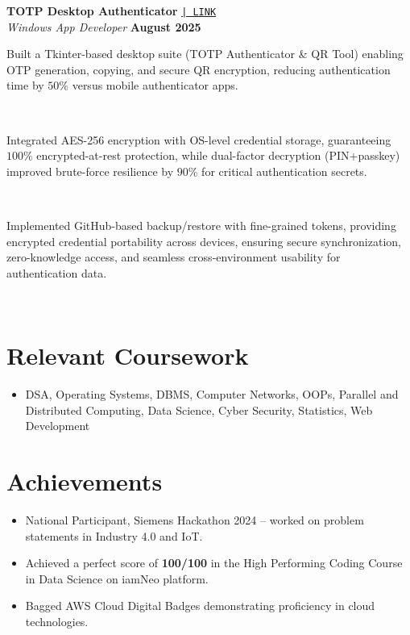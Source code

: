 \documentclass[a4paper,10pt]{article}
\begin{document}
\noindent
\textbf{TOTP Desktop Authenticator}
\href{https://github.com/ppriyanshu26/AuthPublic}{\texttt{| LINK}} \\
\textit{Windows App Developer} \hfill \textbf{August 2025} \\[-8pt]

\noindent\makebox[1.5em][l]{--}%
\parbox[t]{\dimexpr\linewidth-1.5em\relax}{%
Built a Tkinter-based desktop suite (TOTP Authenticator \& QR Tool) enabling OTP generation, copying, and secure QR encryption, reducing authentication time by $50\%$ versus mobile authenticator apps.} \\[-2pt]

\noindent\makebox[1.5em][l]{--}%
\parbox[t]{\dimexpr\linewidth-1.5em\relax}{%
Integrated AES-256 encryption with OS-level credential storage, guaranteeing $100\%$ encrypted-at-rest protection, while dual-factor decryption (PIN+passkey) improved brute-force resilience by $90\%$ for critical authentication secrets.} \\[-2pt]

\noindent\makebox[1.5em][l]{--}%
\parbox[t]{\dimexpr\linewidth-1.5em\relax}{%
Implemented GitHub-based backup/restore with fine-grained tokens, providing encrypted credential portability across devices, ensuring secure synchronization, zero-knowledge access, and seamless cross-environment usability for authentication data.} \\[-4pt]


\section{Relevant Coursework}
  \begin{itemize}
    \item DSA, Operating Systems, DBMS, Computer Networks, OOPs, Parallel and Distributed Computing, Data Science, Cyber Security, Statistics, Web Development
  \end{itemize}

\section{Achievements}
\begin{itemize}[itemsep=1pt, topsep=2pt, parsep=0pt, partopsep=0pt]
    \item National Participant, Siemens Hackathon 2024 – worked on problem statements in Industry 4.0 and IoT.
    \item Achieved a perfect score of \textbf{100/100} in the High Performing Coding Course in Data Science on iamNeo platform.
    \item Bagged AWS Cloud Digital Badges demonstrating proficiency in cloud technologies.
\end{itemize}
\end{document}
